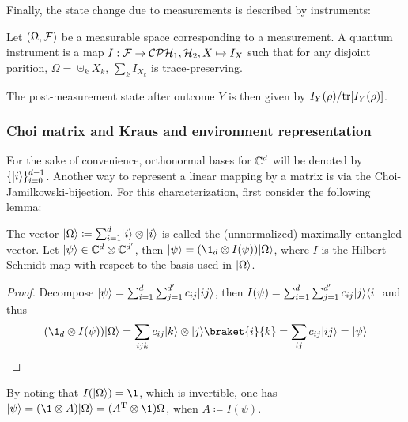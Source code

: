 Finally, the state change due to measurements is described by instruments:
\begin{definition}Let $(\Omega, \mathcal F)$ be a measurable space corresponding to a measurement. A quantum instrument is a map $I:\mathcal F \rightarrow \mathcal{CP}{\mathcal{H}_1, \mathcal{H}_2}, X \mapsto I_X$ such that for any disjoint parition, $\Omega = \uplus_k X_k$, $\sum_k I_{X_k}$ is trace-preserving.{}
\end{definition}
The post-measurement state after outcome $Y$ is then given by $I_Y(\rho)/\mathrm{tr}[I_Y(\rho)]$.

\subsubsection{Choi matrix and Kraus and environment representation}
For the sake of convenience, orthonormal bases for $\mathbb{C}^d$ will be denoted by $\{\lvert i\rangle\}_{i=0}^{d-1}$. Another way to represent a linear mapping by a matrix is via the Choi-Jamilkowski-bijection. For this characterization, first consider the following lemma:
\begin{prop}[Cyclicity]\label{prop:cyclicity}
    The vector
    $\lvert\Omega\rangle \coloneqq \sum_{i=1}^{d}\lvert i\rangle\otimes\lvert i\rangle$ is called the (unnormalized) maximally entangled vector. Let $\lvert\psi\rangle\in \mathbb{C}^d\otimes \mathbb{C}^{d'}$, then $\ket \psi = (\1_d \otimes I(\psi))\ket \Omega$, where $I$ is the Hilbert-Schmidt map with respect to the basis used in $\lvert\Omega\rangle$.
\end{prop}
\begin{proof}
    Decompose $\lvert\psi\rangle = \sum_{i=1}^d\sum_{j=1}^{d'}c_{ij}\lvert ij\rangle$, then $I(\psi) = \sum_{i=1}^d\sum_{j=1}^{d'}c_{ij} \lvert j\rangle\langle i\rvert$ and thus 
    \begin{align*}
    (\1_d \otimes I(\psi))\ket \Omega = \sum_{ijk}c_{ij}\ket{k}\otimes \ket{j}\braket{i}{k} = \sum_{ij}c_{ij}\ket{ij}=\ket\psi
    \end{align*}
\end{proof}
By noting that $I(\ket\Omega) = \1$, which is invertible, one has $\ket \psi = (\1 \otimes A)\ket \Omega = (A^\text T\otimes \1)\Omega$, when $A\coloneqq I(\psi)$.
